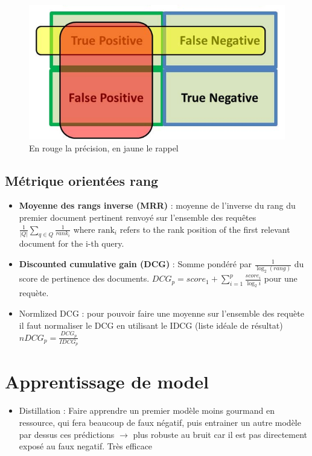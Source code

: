 \documentclass{article}
\theoremstyle{plain}%
\theoremstyle{definition}
\theoremstyle{remark}
\begin{document}
\begin{figure}[!htbp]
    \centering
    \includegraphics*[width=.5\textwidth]{precision_recall_conf_matrix.png}
    \caption{En rouge la précision, en jaune le rappel}
    \label{fig:precision_recall}
\end{figure}

\subsection{Métrique orientées rang}
\begin{itemize}
    \item \textbf{Moyenne des rangs inverse (MRR)} : moyenne de l'inverse du rang du premier document pertinent renvoyé sur l'ensemble des requêtes $ \frac{1}{\left| Q \right| } \sum_{q \in Q}^{} \frac{1}{rank_i} $ where $ \text{rank}_{i}$ refers to the rank position of the first relevant document for the i-th query.
    
    \item \textbf{Discounted cumulative gain (DCG)} :  Somme pondéré par $ \frac{1}{\log_{2} (rang)} $ du score de pertinence des documents. $ DCG_p = score_1 + \sum_{i=1}^{p} \frac{score_i}{\log_{2} i} $ pour une requète. 
    \item Normlized DCG : pour pouvoir faire une moyenne sur l'ensemble des requète il faut normaliser le DCG en utilisant le IDCG (liste idéale de résultat) $ nDCG_p = \frac{DCG_p}{IDCG_p} $ 
\end{itemize}

\section{Apprentissage de model}
\begin{itemize}
    \item Distillation : Faire apprendre un premier modèle moins gourmand en ressource, qui fera beaucoup de faux négatif, puis entrainer un autre modèle par dessus ces prédictions $\rightarrow$ plus robuste au bruit car il est pas directement exposé au faux negatif. Très efficace
\end{itemize}
\end{document}
